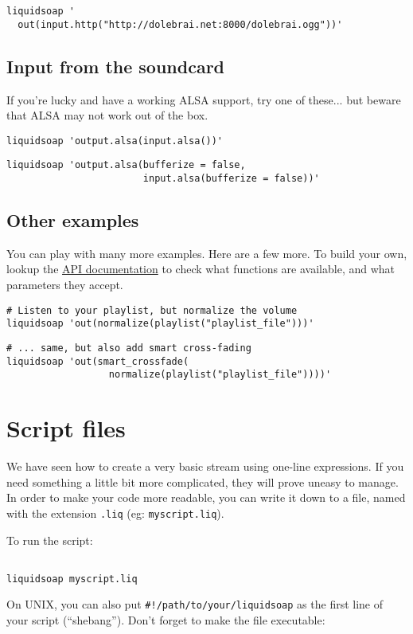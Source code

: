 \documentclass{book}
\begin{document}
\begin{verbatim}
liquidsoap '
  out(input.http("http://dolebrai.net:8000/dolebrai.ogg"))'
\end{verbatim}
\subsection{Input from the soundcard}
If you're lucky and have a working ALSA support, try one of these... but beware
that ALSA may not work out of the box.

\begin{verbatim}
liquidsoap 'output.alsa(input.alsa())'
\end{verbatim}
\begin{verbatim}
liquidsoap 'output.alsa(bufferize = false,
                        input.alsa(bufferize = false))'
\end{verbatim}
\subsection{Other examples}
You can play with many more examples. Here are a few more. To build your own,
lookup the \href{reference.html}{API documentation} to check what functions are
available, and what parameters they accept.

\begin{verbatim}
# Listen to your playlist, but normalize the volume
liquidsoap 'out(normalize(playlist("playlist_file")))'
\end{verbatim}
\begin{verbatim}
# ... same, but also add smart cross-fading
liquidsoap 'out(smart_crossfade(
                  normalize(playlist("playlist_file"))))'
\end{verbatim}
\section{Script files}
We have seen how to create a very basic stream using one-line expressions. If
you need something a little bit more complicated, they will prove uneasy to
manage. In order to make your code more readable, you can write it down to a
file, named with the extension \verb+.liq+ (eg: \verb+myscript.liq+).

To run the script:

\begin{verbatim}

liquidsoap myscript.liq
\end{verbatim}
On UNIX, you can also put \verb+#!/path/to/your/liquidsoap+ as the first line of
your script (``shebang''). Don't forget to make the file executable:
\end{document}

